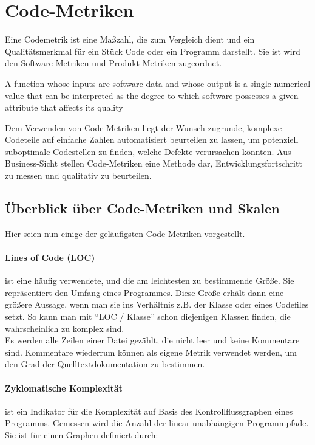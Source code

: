 \section{Code-Metriken}
Eine Codemetrik ist eine Maßzahl, die zum Vergleich dient und ein Qualitätsmerkmal für ein Stück Code oder ein Programm darstellt. Sie ist wird den Software-Metriken und Produkt-Metriken zugeordnet.

\epigraph{A function whose inputs are software data and whose output is a single
numerical value that can be interpreted as the degree to which software possesses a given attribute that affects its quality}{\cite{ieee_1998}}

Dem Verwenden von Code-Metriken liegt der Wunsch zugrunde, komplexe Codeteile auf einfache Zahlen automatisiert beurteilen zu lassen, um potenziell suboptimale Codestellen zu finden, welche Defekte verursachen könnten. Aus Business-Sicht stellen Code-Metriken eine Methode dar, Entwicklungsfortschritt zu messen und qualitativ zu beurteilen.
\subsection{Überblick über Code-Metriken und Skalen}
Hier seien nun einige der geläufigsten Code-Metriken vorgestellt.
\paragraph{Lines of Code (LOC)} ist eine häufig verwendete, und die am leichtesten zu bestimmende Größe. Sie repräsentiert den Umfang eines Programmes. Diese Größe erhält dann eine größere Aussage, wenn man sie ins Verhältnis z.B. der Klasse oder eines Codefiles setzt. So kann man mit "`LOC / Klasse"' schon diejenigen Klassen finden, die wahrscheinlich zu komplex sind. \\
Es werden alle Zeilen einer Datei gezählt, die nicht leer und keine Kommentare sind. Kommentare wiederrum können als eigene Metrik verwendet werden, um den Grad der Quelltextdokumentation zu bestimmen.

\paragraph{Zyklomatische Komplexität} ist ein Indikator für die Komplexität auf Basis des Kontrollflussgraphen eines Programms. Gemessen wird die Anzahl der linear unabhängigen Programmpfade. Sie ist für einen Graphen definiert durch:


